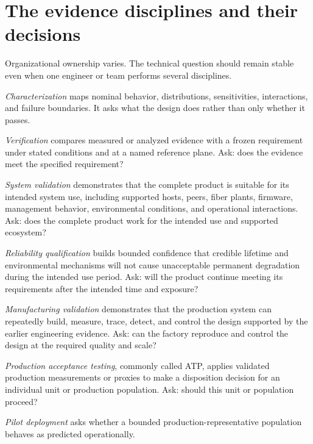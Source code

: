 \section{The evidence disciplines and their decisions}
\label{sec:evidence-disciplines}

Organizational ownership varies. The technical question should remain stable
even when one engineer or team performs several disciplines.

\emph{Characterization} maps nominal behavior, distributions, sensitivities,
interactions, and failure boundaries. It asks what the design does rather than
only whether it passes.

\emph{Verification} compares measured or analyzed evidence with a frozen
requirement under stated conditions and at a named reference plane. Ask: does
the evidence meet the specified requirement?

\emph{System validation} demonstrates that the complete product is suitable for
its intended system use, including supported hosts, peers, fiber plants,
firmware, management behavior, environmental conditions, and operational
interactions. Ask: does the complete product work for the intended use and
supported ecosystem?

\emph{Reliability qualification} builds bounded confidence that credible
lifetime and environmental mechanisms will not cause unacceptable permanent
degradation during the intended use period. Ask: will the product continue
meeting its requirements after the intended time and exposure?

\emph{Manufacturing validation} demonstrates that the production system can
repeatedly build, measure, trace, detect, and control the design supported by
the earlier engineering evidence. Ask: can the factory reproduce and control
the design at the required quality and scale?

\emph{Production acceptance testing}, commonly called
ATP, applies validated production measurements or
proxies to make a disposition decision for an individual unit or production
population. Ask: should this unit or population proceed?

\emph{Pilot deployment} asks whether a bounded production-representative population behaves
as predicted operationally.

